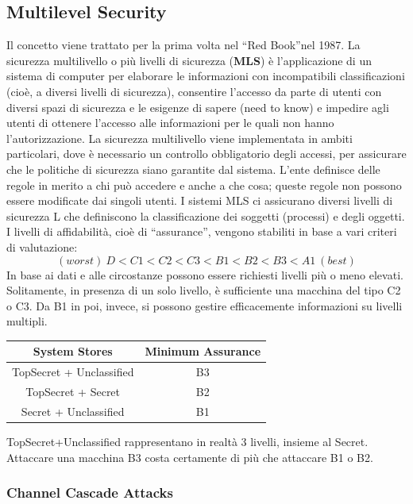 \subsection{Multilevel Security}
Il concetto viene trattato per la prima volta nel “Red Book”nel 1987.
La sicurezza multilivello o più livelli di sicurezza (\textbf{MLS}) è
l'applicazione di un sistema di computer
per elaborare le informazioni con incompatibili classificazioni (cioè, a diversi
livelli di sicurezza),
consentire l'accesso da parte di utenti con diversi spazi di sicurezza e le
esigenze di sapere (need
to know) e impedire agli utenti di ottenere l'accesso alle informazioni per
le quali non hanno
l'autorizzazione.
La sicurezza multilivello viene implementata in ambiti particolari, dove è
necessario un controllo
obbligatorio degli accessi, per assicurare che le politiche di sicurezza siano
garantite dal sistema.
L'ente definisce delle regole in merito a chi può accedere e anche a che cosa;
queste regole non
possono essere modificate dai singoli utenti.
I sistemi MLS ci assicurano diversi livelli di sicurezza L che definiscono la
classificazione dei
soggetti (processi) e degli oggetti. I livelli di affidabilità, cioè di
“assurance”, vengono stabiliti in
base a vari criteri di valutazione:
\[
    (worst) \ D<C1<C2<C3<B1<B2<B3<A1 \ (best)
\]
In base ai dati e alle circostanze possono essere richiesti livelli più o meno
elevati. Solitamente, in
presenza di un solo livello, è sufficiente una macchina del tipo C2 o C3. Da B1
in poi, invece, si
possono gestire efficacemente informazioni su livelli multipli.
\begin{center}
    \begin{tabular}{ |c|c| }
        \hline
        \textbf{System Stores}   & \textbf{Minimum Assurance} \\
        \hline
        TopSecret + Unclassified & B3                         \\
        \hline
        TopSecret + Secret       & B2                         \\
        \hline
        Secret + Unclassified    & B1                         \\
        \hline
    \end{tabular}
\end{center}
TopSecret+Unclassified rappresentano in realtà 3 livelli, insieme al Secret.
Attaccare una macchina B3 costa certamente di più che attaccare B1 o B2.

\subsubsection{Channel Cascade Attacks}

